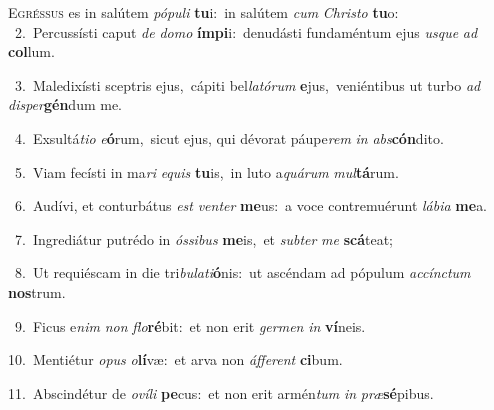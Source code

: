 \lettrine{\initial\textcolor{\initialcolor}{E}}{gréssus} es in salútem \textit{pó}\-\textit{pu}\textit{li} \textbf{tu}\-i:~\star in salútem \textit{cum} \textit{Chris}\-\textit{to} \textbf{tu}\-o:\\
{\numbfont\textcolor{\numbcolor}{~2.}}~Percussísti caput \textit{de} \textit{do}\-\textit{mo} \textbf{ím}\-\textbf{pi}i:~\star denudásti fundaméntum ejus \textit{us}\-\textit{que} \textit{ad} \textbf{col}\-lum.\par
{\numbfont\textcolor{\numbcolor}{~3.}}~Maledixísti sceptris ejus,~\dagger cápiti bel\-\textit{la}\-\textit{tó}\textit{rum} \textbf{e}\-jus,~\star veniéntibus ut turbo \textit{ad} \textit{di}\-\textit{sper}\textbf{gén}dum me.\par
{\numbfont\textcolor{\numbcolor}{~4.}}~Exsultá\-\textit{ti}\-\textit{o} \textit{e}\-\textbf{ó}rum,~\star sicut ejus, qui dévorat páupe\textit{rem} \textit{in} \textit{abs}\-\textbf{cón}dito.\par
{\numbfont\textcolor{\numbcolor}{~5.}}~Viam fecísti in ma\textit{ri} \textit{e}\-\textit{quis} \textbf{tu}\-is,~\star in luto a\-\textit{quá}\-\textit{rum} \textit{mul}\-\textbf{tá}rum.\par
{\numbfont\textcolor{\numbcolor}{~6.}}~Audívi, et conturbátus \textit{est} \textit{ven}\-\textit{ter} \textbf{me}\-us:~\star a voce contremuérunt \textit{lá}\-\textit{bi}\textit{a} \textbf{me}\-a.\par
{\numbfont\textcolor{\numbcolor}{~7.}}~Ingrediátur putrédo in \textit{ós}\-\textit{si}\textit{bus} \textbf{me}\-is,~\star et \textit{sub}\-\textit{ter} \textit{me} \textbf{scá}\-teat;\par
{\numbfont\textcolor{\numbcolor}{~8.}}~Ut requiéscam in die tri\-\textit{bu}\-\textit{la}\textit{ti}\textbf{ó}nis:~\star ut ascéndam ad pópulum \textit{ac}\-\textit{cínc}\textit{tum} \textbf{nos}\-trum.\par
{\numbfont\textcolor{\numbcolor}{~9.}}~Ficus e\textit{nim} \textit{non} \textit{flo}\-\textbf{ré}bit:~\star et non erit \textit{ger}\-\textit{men} \textit{in} \textbf{ví}\-neis.\par
{\numbfont\textcolor{\numbcolor}{10.}}~Mentiétur \textit{o}\-\textit{pus} \textit{o}\-\textbf{lí}væ:~\star et arva non \textit{áf}\-\textit{fe}\textit{rent} \textbf{ci}\-bum.\par
{\numbfont\textcolor{\numbcolor}{11.}}~Abscindétur de \textit{o}\-\textit{ví}\textit{li} \textbf{pe}\-cus:~\star et non erit armén\textit{tum} \textit{in} \textit{præ}\-\textbf{sé}pibus.\par
